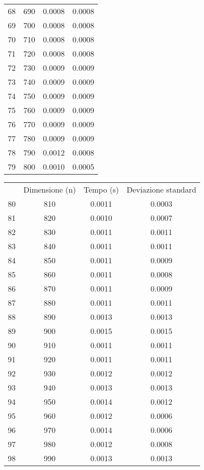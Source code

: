 \begin{table}
\begin{adjustbox}{width=1\textwidth/2}
\begin{tabular}{|c|c|c|c|}
68 & 690 & 0.0008 & 0.0008 \\
\cline{1-4}
69 & 700 & 0.0008 & 0.0008 \\
\cline{1-4}
70 & 710 & 0.0008 & 0.0008 \\
\cline{1-4}
71 & 720 & 0.0008 & 0.0008 \\
\cline{1-4}
72 & 730 & 0.0009 & 0.0009 \\
\cline{1-4}
73 & 740 & 0.0009 & 0.0009 \\
\cline{1-4}
74 & 750 & 0.0009 & 0.0009 \\
\cline{1-4}
75 & 760 & 0.0009 & 0.0009 \\
\cline{1-4}
76 & 770 & 0.0009 & 0.0009 \\
\cline{1-4}
77 & 780 & 0.0009 & 0.0009 \\
\cline{1-4}
78 & 790 & 0.0012 & 0.0008 \\
\cline{1-4}
79 & 800 & 0.0010 & 0.0005 \\
\cline{1-4}
\end{tabular}
\end{adjustbox}
\end{table}

\begin{table}
\centering
\begin{adjustbox}{width=1\textwidth/2}
\begin{tabular}{|c|c|c|c|}
\hline
 & Dimensione (n) & Tempo (s) & Deviazione standard \\
80 & 810 & 0.0011 & 0.0003 \\
\cline{1-4}
81 & 820 & 0.0010 & 0.0007 \\
\cline{1-4}
82 & 830 & 0.0011 & 0.0011 \\
\cline{1-4}
83 & 840 & 0.0011 & 0.0011 \\
\cline{1-4}
84 & 850 & 0.0011 & 0.0009 \\
\cline{1-4}
85 & 860 & 0.0011 & 0.0008 \\
\cline{1-4}
86 & 870 & 0.0011 & 0.0009 \\
\cline{1-4}
87 & 880 & 0.0011 & 0.0011 \\
\cline{1-4}
88 & 890 & 0.0013 & 0.0013 \\
\cline{1-4}
89 & 900 & 0.0015 & 0.0015 \\
\cline{1-4}
90 & 910 & 0.0011 & 0.0011 \\
\cline{1-4}
91 & 920 & 0.0011 & 0.0011 \\
\cline{1-4}
92 & 930 & 0.0012 & 0.0012 \\
\cline{1-4}
93 & 940 & 0.0013 & 0.0013 \\
\cline{1-4}
94 & 950 & 0.0014 & 0.0012 \\
\cline{1-4}
95 & 960 & 0.0012 & 0.0006 \\
\cline{1-4}
96 & 970 & 0.0014 & 0.0006 \\
\cline{1-4}
97 & 980 & 0.0012 & 0.0008 \\
\cline{1-4}
98 & 990 & 0.0013 & 0.0013 \\
\cline{1-4}
\end{tabular}
\end{adjustbox}
\end{table}
